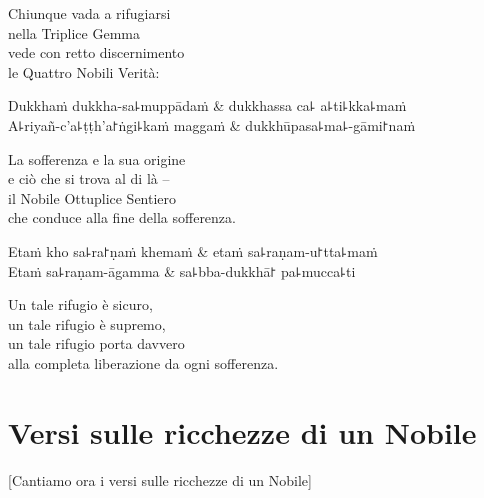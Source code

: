 \begin{english}
  Chiunque vada a rifugiarsi\\
  nella Triplice Gemma\\
  vede con retto discernimento\\
  le Quattro Nobili Verità:
\end{english}

\begin{twochants}
  Dukkhaṁ dukkha-sa꜕muppādaṁ & dukkhassa ca꜕ a꜕ti꜕kka꜕maṁ \\
  A꜕riyañ-c'a꜕ṭṭh'a꜓ṅgi꜕kaṁ maggaṁ & dukkhūpasa꜕ma꜕-gāmi꜓naṁ \\
\end{twochants}

\begin{english}
  La sofferenza e la sua origine\\
  e ciò che si trova al di là –\\
  il Nobile Ottuplice Sentiero\\
  che conduce alla fine della sofferenza.
\end{english}

\begin{twochants}
  Etaṁ kho sa꜕ra꜓ṇaṁ khemaṁ & etaṁ sa꜕raṇam-u꜓tta꜕maṁ \\
  Etaṁ sa꜕raṇam-āgamma & sa꜕bba-dukkhā꜓ pa꜕mucca꜕ti \\
\end{twochants}

\begin{english}
  Un tale rifugio è sicuro,\\
  un tale rifugio è supremo,\\
  un tale rifugio porta davvero\\
  alla completa liberazione da ogni sofferenza.
\end{english}

\chapter{Versi sulle ricchezze di un Nobile}


\begin{leader}
\end{leader}

\begin{english}
  [Cantiamo ora i versi sulle ricchezze di un Nobile]
\end{english}

